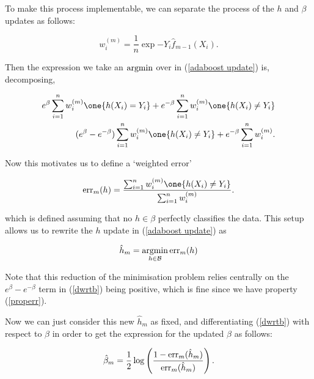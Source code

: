 \documentclass[11pt]{scrartcl}
\begin{document}
To make this process implementable, we can separate the process of the $h$ and $\beta$ updates as follows:

\begin{equation}
    w_i^{(m)} = \frac1n \exp{ -Y_i \hat{f}_{m-1}(X_i) }.
\end{equation}

Then the expression we take an $\operatorname*{arg min}$ over in (\ref{adaboost update}) is, decomposing,

\begin{align}
    e^\beta \sum_{i=1}^n w_i^{(m)} \one{ h(X_i) = Y_i } + e^{-\beta} \sum_{i=1}^n w_i^{(m)} \one{h(X_i) \neq Y_i} \\
    (e^\beta - e^{-\beta}) \sum_{i=1}^n w_i^{(m)} \one{h(X_i) \neq Y_i} +  e^{-\beta} \sum_{i=1}^n w_i^{(m)}.
\label{dwrtb}
\end{align}

Now this motivates us to define a `weighted error'

\begin{equation}
    \err_m(h) = \frac{\sum_{i=1}^n w_i^{(m)} \one{h(X_i) \neq Y_i}}{\sum_{i=1}^n w_i^{(m)}}.
\label{errdef}
\end{equation}

which is defined assuming that no $h \in \beta$ perfectly classifies the data. This setup allows us to rewrite the $h$ update in (\ref{adaboost update}) as

\begin{equation}
   \hat{h}_m = \operatorname*{arg min}_{h \in \mathcal{B}} \text{err}_m(h)
\end{equation}

Note that this reduction of the minimisation problem relies centrally on the $e^{\beta} - e^{-\beta}$ term in (\ref{dwrtb}) being positive, which is fine since we have property (\ref{properr}).

Now we can just consider this new $ \hat{h}_m$ as fixed, and differentiating (\ref{dwrtb}) with respect to $\beta$ in order to get the expression for the updated $\beta$ as follows:

\begin{equation}
    \hat{\beta}_m = \frac12 \log \left( \frac{1 - \text{err}_m(\hat{h}_m)}{\text{err}_m(\hat{h}_m)} \right).
\end{equation}
\end{document}
